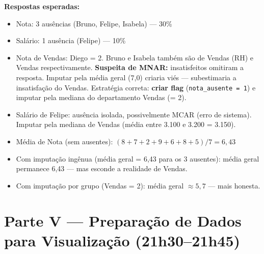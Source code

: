 \begin{BoardBox}
\textbf{Respostas esperadas:}
\begin{itemize}
  \item Nota: 3 ausências (Bruno, Felipe, Isabela) — 30\%
  \item Salário: 1 ausência (Felipe) — 10\%
  \item Nota de Vendas: Diego = 2. Bruno e Isabela também são de Vendas (RH) e
  Vendas respectivamente. \textbf{Suspeita de MNAR:} insatisfeitos omitiram a resposta.
  Imputar pela média geral (7{,}0) criaria viés — subestimaria a insatisfação do Vendas.
  Estratégia correta: \textbf{criar flag} (\texttt{nota\_ausente = 1}) e imputar
  pela mediana do departamento Vendas (= 2).
  \item Salário de Felipe: ausência isolada, possivelmente MCAR (erro de sistema).
  Imputar pela mediana de Vendas (média entre 3.100 e 3.200 = 3.150).
  \item Média de Nota (sem ausentes): $(8+7+2+9+6+8+5)/7 = 6{,}43$
  \item Com imputação ingênua (média geral = 6,43 para os 3 ausentes): média geral
  permanece 6,43 — mas esconde a realidade de Vendas.
  \item Com imputação por grupo (Vendas = 2): média geral $\approx 5{,}7$ — mais honesta.
\end{itemize}
\end{BoardBox}

\section{Parte V — Preparação de Dados para Visualização (21h30–21h45)}

